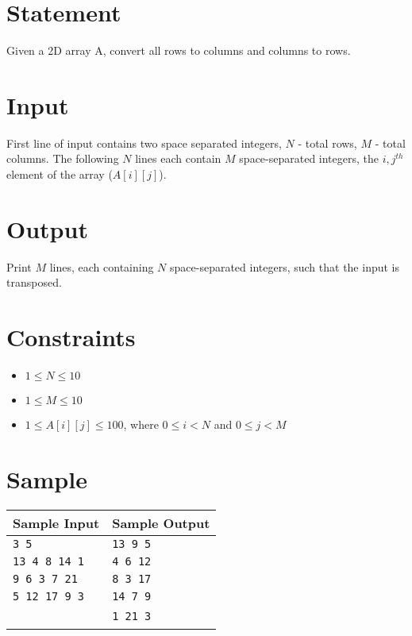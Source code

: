 \documentclass{article}
\begin{document}
\section*{Statement}

Given a 2D array A, convert all rows to columns and columns to rows.

\section*{Input}

First line of input contains two space separated integers, $N$ - total rows, $M$ - total columns. The following $N$ lines each contain $M$ space-separated integers, the $i,j^{th}$ element of the array ($A[i][j]$).

\section*{Output}

Print $M$ lines, each containing $N$ space-separated integers, such that the input is transposed.

\section*{Constraints}

\begin{itemize}
    \item $1 \le N \le 10$
    \item $1 \le M \le 10$
    \item $1 \le A[i][j] \le 100$, where $0 \le i < N$ and $0 \le j < M$
\end{itemize}

\section*{Sample}

\begin{tabular}{l|l}
    \hline
    \hline
    Sample Input & Sample Output \\
    \hline
    \verb+3 5+ & \verb+13 9 5+ \\
    \verb+13 4 8 14 1+ & \verb+4 6 12+ \\
    \verb+9 6 3 7 21+ & \verb+8 3 17+ \\
    \verb+5 12 17 9 3+ & \verb+14 7 9+ \\
    \ & \verb+1 21 3+ \\
    \hline
\end{tabular}
\end{document}
